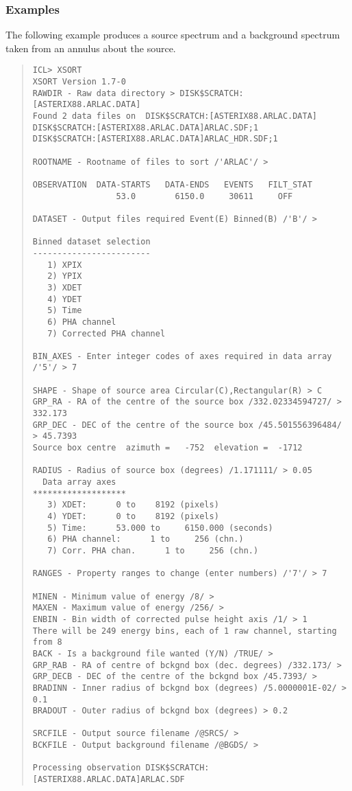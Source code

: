 \documentclass{book}
\renewcommand{\_}{{\tt\char'137}}     %
\begin{document}
\subsubsection{Examples}
The following example produces a source spectrum and a background
spectrum taken from an annulus about the source.
\begin{quote}\begin{verbatim}
ICL> XSORT
XSORT Version 1.7-0
RAWDIR - Raw data directory > DISK$SCRATCH:[ASTERIX88.ARLAC.DATA]
Found 2 data files on  DISK$SCRATCH:[ASTERIX88.ARLAC.DATA]
DISK$SCRATCH:[ASTERIX88.ARLAC.DATA]ARLAC.SDF;1
DISK$SCRATCH:[ASTERIX88.ARLAC.DATA]ARLAC_HDR.SDF;1
 
ROOTNAME - Rootname of files to sort /'ARLAC'/ >
 
OBSERVATION  DATA-STARTS   DATA-ENDS   EVENTS   FILT_STAT
                 53.0        6150.0     30611     OFF
 
DATASET - Output files required Event(E) Binned(B) /'B'/ >
 
Binned dataset selection
------------------------
   1) XPIX
   2) YPIX
   3) XDET
   4) YDET
   5) Time
   6) PHA channel
   7) Corrected PHA channel
 
BIN_AXES - Enter integer codes of axes required in data array /'5'/ > 7
 
SHAPE - Shape of source area Circular(C),Rectangular(R) > C
GRP_RA - RA of the centre of the source box /332.02334594727/ > 332.173
GRP_DEC - DEC of the centre of the source box /45.501556396484/ > 45.7393
Source box centre  azimuth =   -752  elevation =  -1712
 
RADIUS - Radius of source box (degrees) /1.171111/ > 0.05
  Data array axes
*******************
   3) XDET:      0 to    8192 (pixels)
   4) YDET:      0 to    8192 (pixels)
   5) Time:      53.000 to     6150.000 (seconds)
   6) PHA channel:      1 to     256 (chn.)
   7) Corr. PHA chan.      1 to     256 (chn.)
 
RANGES - Property ranges to change (enter numbers) /'7'/ > 7
 
MINEN - Minimum value of energy /8/ >
MAXEN - Maximum value of energy /256/ >
ENBIN - Bin width of corrected pulse height axis /1/ > 1
There will be 249 energy bins, each of 1 raw channel, starting from 8
BACK - Is a background file wanted (Y/N) /TRUE/ >
GRP_RAB - RA of centre of bckgnd box (dec. degrees) /332.173/ >
GRP_DECB - DEC of the centre of the bckgnd box /45.7393/ >
BRADINN - Inner radius of bckgnd box (degrees) /5.0000001E-02/ > 0.1
BRADOUT - Outer radius of bckgnd box (degrees) > 0.2
 
SRCFILE - Output source filename /@SRCS/ >
BCKFILE - Output background filename /@BGDS/ >
 
Processing observation DISK$SCRATCH:[ASTERIX88.ARLAC.DATA]ARLAC.SDF
\end{verbatim}\end{quote}
\end{document}
